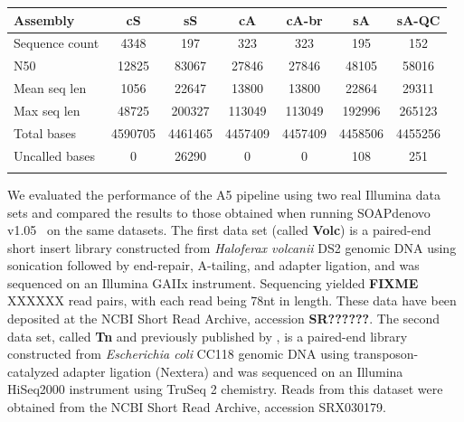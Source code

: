 \documentclass{bioinfo}
\begin{document}

\begin{table}[!t]
{\begin{tabular}{l|cccccc}\toprule
Assembly        & cS      & sS      & cA      & cA-br   & sA      & sA-QC   \\\midrule
Sequence count  & 4348    & 197     & 323     & 323     & 195     & 152     \\
N50             & 12825   & 83067   & 27846   & 27846   & 48105   & 58016   \\
Mean seq len    & 1056    & 22647   & 13800   & 13800   & 22864   & 29311   \\
Max seq len     & 48725   & 200327  & 113049  & 113049  & 192996  & 265123  \\
Total bases     & 4590705 & 4461465 & 4457409 & 4457409 & 4458506 & 4455256 \\
Uncalled bases  & 0       & 26290   & 0       & 0       & 108     & 251     \\
\botrule \\
\end{tabular}}{}
\end{table}

We evaluated the performance of the A5 pipeline using two real Illumina data sets and compared the results to
those obtained when running SOAPdenovo v1.05~\citep{Li2010} on the same datasets. The first data set (called \textbf{Volc}) is a paired-end short insert library constructed from \emph{Haloferax volcanii} DS2 genomic DNA 
using sonication followed by end-repair, A-tailing, and adapter ligation, and was sequenced on an Illumina GAIIx instrument.
Sequencing yielded \textbf{FIXME} XXXXXX read pairs, with each read being 78nt in length. These data have been deposited at the NCBI Short Read Archive, accession \textbf{SR??????}. 
The second data set, called \textbf{Tn} and previously published by \citet{Adey2010}, is a paired-end library constructed from \emph{Escherichia coli} CC118 genomic DNA
using transposon-catalyzed adapter ligation (Nextera) and was sequenced on an Illumina HiSeq2000 instrument using TruSeq 2 chemistry. 
Reads from this dataset were obtained from the NCBI Short Read Archive, accession SRX030179.
\end{document}
